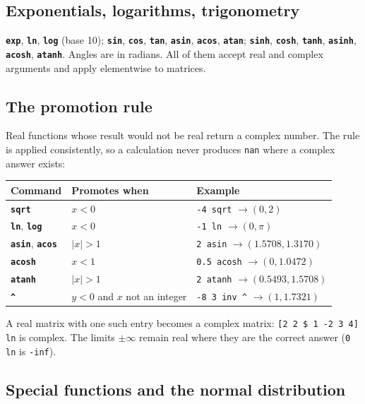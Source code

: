 \documentclass[11pt,letterpaper]{article}
\newcommand{\code}[1]{\texttt{#1}}
\newcommand{\cmd}[1]{\texttt{\textbf{#1}}}
\begin{document}
\subsection{Exponentials, logarithms, trigonometry}

\cmd{exp}, \cmd{ln}, \cmd{log} (base 10); \cmd{sin}, \cmd{cos}, \cmd{tan}, \cmd{asin}, \cmd{acos}, \cmd{atan}; \cmd{sinh}, \cmd{cosh}, \cmd{tanh}, \cmd{asinh}, \cmd{acosh}, \cmd{atanh}. Angles are in radians. All of them accept real and complex arguments and apply elementwise to matrices.

\subsection{The promotion rule}
\label{sec:promotion}

Real functions whose result would not be real return a complex number. The rule is applied consistently, so a calculation never produces \code{nan} where a complex answer exists:

\begin{center}
\begin{tabular}{@{}lll@{}}
\toprule
Command & Promotes when & Example \\
\midrule
\cmd{sqrt}  & $x < 0$   & \code{-4 sqrt} $\to (0, 2)$ \\
\cmd{ln}, \cmd{log} & $x < 0$ & \code{-1 ln} $\to (0, \pi)$ \\
\cmd{asin}, \cmd{acos} & $|x| > 1$ & \code{2 asin} $\to (1.5708, 1.3170)$ \\
\cmd{acosh} & $x < 1$   & \code{0.5 acosh} $\to (0, 1.0472)$ \\
\cmd{atanh} & $|x| > 1$ & \code{2 atanh} $\to (0.5493, 1.5708)$ \\
\cmd{\textasciicircum} & $y < 0$ and $x$ not an integer & \code{-8 3 inv \textasciicircum} $\to (1, 1.7321)$ \\
\bottomrule
\end{tabular}
\end{center}

A real matrix with one such entry becomes a complex matrix: \code{[2 2 \$ 1 -2 3 4] ln} is complex. The limits $\pm\infty$ remain real where they are the correct answer (\code{0 ln} is \code{-inf}).

\subsection{Special functions and the normal distribution}
\end{document}
